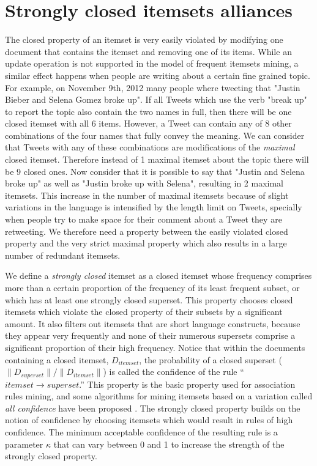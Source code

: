 \documentclass{sig-alternate}
\begin{document}
\section{Strongly closed itemsets alliances}
The closed property of an itemset is very easily violated by modifying one document that contains the itemset and removing one of its items. While an update operation is not supported in the model of frequent itemsets mining, a similar effect happens when people are writing about a certain fine grained topic. For example, on November 9th, 2012 many people where tweeting that "Justin Bieber and Selena Gomez broke up". If all Tweets which use the verb "break up" to report the topic also contain the two names in full, then there will be one closed itemset with all 6 items. However, a Tweet can contain any of 8 other combinations of the four names that fully convey the meaning. We can consider that Tweets with any of these combinations are modifications of the \emph{maximal} closed itemset. Therefore instead of 1 maximal itemset about the topic there will be 9 closed ones. Now consider that it is possible to say that "Justin and Selena broke up" as well as "Justin broke up with Selena", resulting in 2 maximal itemsets. This increase in the number of maximal itemsets because of slight variations in the language is intensified by the length limit on Tweets, specially when people try to make space for their comment about a Tweet they are retweeting. We therefore need a property between the easily violated closed property and the very strict maximal property which also results in a large number of redundant itemsets. 

We define a \emph{strongly closed} itemset as a closed itemset whose frequency comprises more than a certain proportion of the frequency of its least frequent subset, or which has at least one strongly closed superset. This property chooses closed itemsets which violate the closed property of their subsets by a significant amount. It also filters out itemsets that are short language constructs, because they appear very frequently and none of their numerous supersets comprise a significant proportion of their high frequency. Notice that within the documents containing a closed itemset, $D_{itemset}$, the probability of a closed superset ($\|D_{superset}\| / \|D_{itemset}\|$) is called the confidence of the rule ``$itemset \rightarrow superset$.'' This property is the basic property used for association rules mining, and some algorithms for mining itemsets based on a variation called \emph{all confidence} have been proposed \cite{confidenceclosed}. The strongly closed property builds on the notion of confidence by choosing itemsets which would result in rules of high confidence. The minimum acceptable confidence of the resulting rule is a parameter $\kappa$ that can vary between 0 and 1 to increase the strength of the strongly closed property.
\end{document}
